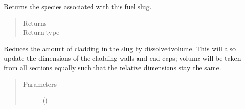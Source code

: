 \documentclass[letterpaper,10pt,openany,oneside,english]{sphinxmanual}
\begin{document}
\begin{fulllineitems}
\begin{fulllineitems}
\end{fulllineitems}


\begin{fulllineitems}
\label{\detokenize{support_rst/fuelslug:fuelslug.FuelSlug.GetSpecs}}
Returns the species associated with this fuel slug.
\begin{quote}\begin{description}
\item[{Returns}] \leavevmode
{}

\item[{Return type}] \leavevmode
{}

\end{description}\end{quote}

\end{fulllineitems}


\begin{fulllineitems}
\label{\detokenize{support_rst/fuelslug:fuelslug.FuelSlug.ReduceCladdingVolume}}
Reduces the amount of cladding in the slug by dissolvedvolume.
This will also update the dimensions of the cladding walls and
end caps; volume will be taken from all sections equally such that the
relative dimensions stay the same.
\begin{quote}\begin{description}
\item[{Parameters}] \leavevmode
{} () \textendash{} 

\end{description}\end{quote}

\end{fulllineitems}



\end{fulllineitems}
\end{document}
